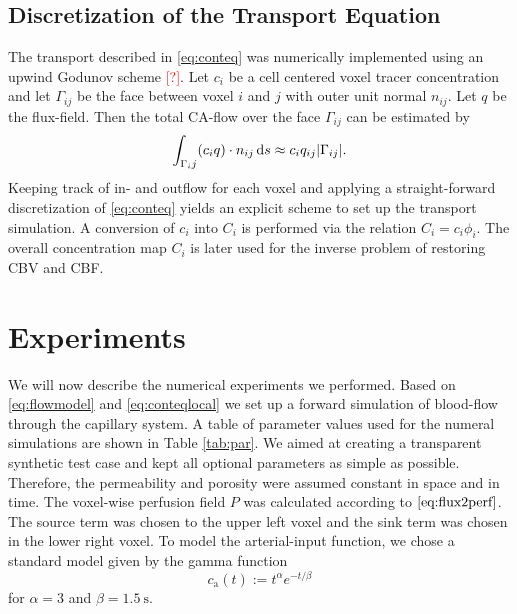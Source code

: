 \documentclass[paper=a4, fontsize=11pt,parskip=half,headings=small]{scrartcl}
\newcommand{\ca}{c_\mathrm{a}}
\newcommand{\missingsource}{\textcolor{red}{[?]}}
\begin{document}
	\subsection{Discretization of the Transport Equation} \label{sec:numtrans}
	The transport described in \eqref{eq:conteq} was numerically implemented using an upwind Godunov scheme \missingsource.
	Let $c_i$ be a cell centered voxel tracer concentration and let $\Gamma_{ij}$ be the face between voxel $i$ and $j$ with outer unit normal $n_{ij}$.
	Let $q$ be the flux-field. 
	Then the total CA-flow over the face $\Gamma_{ij}$ can be estimated by
	\[
		\int_{\Gamma_ij} (c_i q)\cdot n_{ij} \,\mathrm{d} s \approx c_i q_{ij} \vert \Gamma_{ij} \vert.
	\]
	Keeping track of in- and outflow for each voxel and applying a straight-forward discretization of \eqref{eq:conteq} yields an explicit scheme to set up the transport simulation.
	A conversion of $c_i$ into $C_i$ is performed via the relation $C_i = c_i\phi_i$. 
	The overall concentration map $C_i$ is later used for the inverse problem of restoring CBV and CBF.





	\section{Experiments}\label{sec:NumExp}

	We will now describe the numerical experiments we performed.
	Based on \eqref{eq:flowmodel} and \eqref{eq:conteqlocal} we set up a forward simulation of blood-flow through the capillary system.
	A table of parameter values used for the numeral simulations are shown in Table \ref{tab:par}. 
	We aimed at creating a transparent synthetic test case and kept all optional parameters as simple as possible. 
	Therefore, the permeability and porosity were assumed constant in space and in time.
	The voxel-wise perfusion field $P$ was calculated according to $\eqref{eq:flux2perf}$. 
	The source term was chosen to the upper left voxel and the sink term was chosen in the lower right voxel.
	To model the arterial-input function, we chose a standard model \cite{wu03} given by the gamma function
	\[
		\ca(t) := t^\alpha e^{-t/\beta}
	\]
	for $\alpha=3$ and $\beta = \SI{1.5}{\second}$.
	
\end{document}
